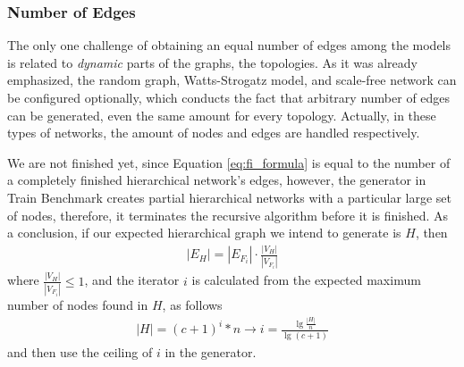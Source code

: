 \subsubsection{Number of Edges}

The only one challenge of obtaining an equal number of edges among the models is related to \textit{dynamic} parts of the graphs, the topologies. As it was already emphasized, the random graph, Watts-Strogatz model, and scale-free network can be configured optionally, which conducts the fact that arbitrary number of edges can be generated, even the same amount for every topology. Actually, in these types of networks, the amount of nodes and edges are handled respectively.


We are not finished yet, since Equation \ref{eq:fi_formula} is equal to the number of a completely finished hierarchical network's edges, however, the generator in Train Benchmark creates partial hierarchical networks with a particular large set of nodes, therefore, it terminates the recursive algorithm before it is finished. As a conclusion, if our expected hierarchical graph we intend to generate is $H$, then
\begin{align}
	|E_H| = |E_{F_i}| \cdot \frac{|V_H|}{|V_{F_i}|}
\end{align}
where $\frac{|V_H|}{|V_{F_i}|} \leq 1$, and the iterator $i$ is calculated from the expected maximum number of nodes found in $H$, as follows
\begin{align}
	|H| = (c+1)^i * n  \longrightarrow  i = \frac{\lg\frac{|H|}{n}}{\lg(c+1)}
\end{align}
and then use the ceiling of $i$ in the generator.

